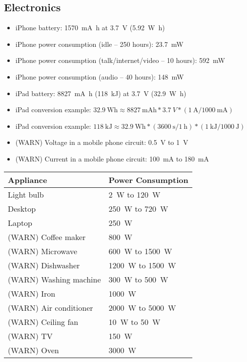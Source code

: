 \documentclass{article}
\begin{document}
\subsection{Electronics}
	\begin{itemize}
		\item iPhone battery: \SI{1570}{\milli\ampere\hour} at \SI{3.7}{\volt} (\SI{5.92}{\watt\hour})
		\item iPhone power consumption (idle -- 250 hours): \SI{23.7}{\milli\watt}
		\item iPhone power consumption (talk/internet/video -- 10 hours): \SI{592}{\milli\watt}
		\item iPhone power consumption (audio -- 40 hours): \SI{148}{\milli\watt}
		\item iPad battery: \SI{8827}{\milli\ampere\hour} (\SI{118}{\kilo\joule}) at \SI{3.7}{\volt} (\SI{32.9}{\watt\hour})
		\item iPad conversion example: $\SI{32.9}{\watt\hour} \approx \SI{8827}{\milli\ampere\hour} * \SI{3.7}{V} * (\SI{1}{\ampere} / \SI{1000}{\milli\ampere})$
		\item iPad conversion example: $\SI{118}{\kilo\joule} \approx \SI{32.9}{\watt\hour} * (\SI{3600}{\s} / \SI{1}{\hour}) * (\SI{1}{\kilo\joule} / \SI{1000}{\joule})$
		\item (WARN) Voltage in a mobile phone circuit: \SI{0.5}{\volt} to \SI{1}{\volt}
		\item (WARN) Current in a mobile phone circuit: \SI{100}{\milli\ampere} to \SI{180}{\milli\ampere}
	\end{itemize}
\begin{table}[H]
	\centering
	\begin{tabularx}{0.75\textwidth}{ X X }
		Appliance & Power Consumption \\
		\hline
		Light bulb & \SI{2}{\watt} to \SI{120}{\watt} \\
		Desktop & \SI{250}{\watt} to \SI{720}{\watt} \\
		Laptop & \SI{250}{\watt} \\
		(WARN) Coffee maker & \SI{800}{\watt} \\
		(WARN) Microwave & \SI{600}{\watt} to \SI{1500}{\watt} \\
		(WARN) Dishwasher & \SI{1200}{\watt} to \SI{1500}{\watt} \\
		(WARN) Washing machine & \SI{300}{\watt} to \SI{500}{\watt} \\
		(WARN) Iron & \SI{1000}{\watt} \\
		(WARN) Air conditioner & \SI{2000}{\watt} to \SI{5000}{\watt} \\
		(WARN) Ceiling fan & \SI{10}{\watt} to \SI{50}{\watt} \\
		(WARN) TV & \SI{150}{\watt} \\
		(WARN) Oven & \SI{3000}{\watt} \\
	\end{tabularx}
\end{table}
\end{document}
